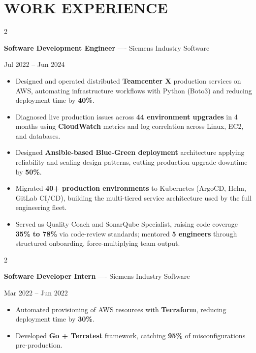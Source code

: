 \documentclass[10pt, letterpaper]{article}
\newenvironment{highlights}{
    \begin{itemize}[
        topsep=0.10 cm,
        parsep=0.06 cm,
        partopsep=0pt,
        itemsep=0.06 cm,
        leftmargin=12pt
    ]
}{
    \end{itemize}
}
\newenvironment{twocolentry}[2][]{
    \onecolentry
    \def\secondColumn{#2}
    \setcolumnwidth{\fill, 4.5 cm}
    \begin{paracol}{2}
}{
    \switchcolumn \raggedleft \secondColumn
    \end{paracol}
    \endonecolentry
}
\begin{document}
\section{WORK EXPERIENCE}
\begin{twocolentry}{Jul 2022 -- Jun 2024}
\textbf{Software Development Engineer} ---- Siemens Industry Software
\end{twocolentry}
\begin{highlights}
  \item Designed and operated distributed \textbf{Teamcenter X} production services on AWS, automating infrastructure workflows with Python (Boto3) and reducing deployment time by \textbf{40\%}.
  \item Diagnosed live production issues across \textbf{44 environment upgrades} in 4 months using \textbf{CloudWatch} metrics and log correlation across Linux, EC2, and databases.
  \item Designed \textbf{Ansible-based Blue-Green deployment} architecture applying reliability and scaling design patterns, cutting production upgrade downtime by \textbf{50\%}.
  \item Migrated \textbf{40+ production environments} to Kubernetes (ArgoCD, Helm, GitLab CI/CD), building the multi-tiered service architecture used by the full engineering fleet.
  \item Served as Quality Coach and SonarQube Specialist, raising code coverage \textbf{35\% to 78\%} via code-review standards; mentored \textbf{5 engineers} through structured onboarding, force-multiplying team output.
\end{highlights}

\vspace{0.15 cm}

\begin{twocolentry}{Mar 2022 -- Jun 2022}
\textbf{Software Developer Intern} ---- Siemens Industry Software
\end{twocolentry}
\begin{highlights}
  \item Automated provisioning of AWS resources with \textbf{Terraform}, reducing deployment time by \textbf{30\%}.
  \item Developed \textbf{Go + Terratest} framework, catching \textbf{95\%} of misconfigurations pre-production.
\end{highlights}

\vspace{0.15 cm}
\end{document}
